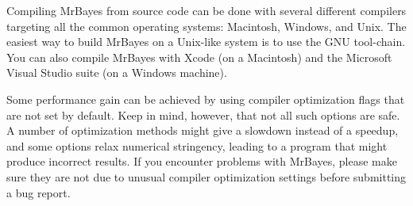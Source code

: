 \documentclass[12pt]{book}
\begin{document}
Compiling MrBayes from source code can be done with several different compilers targeting all the
common operating systems: Macintosh, Windows, and Unix. The easiest way to build MrBayes on a
Unix-like system is to use the GNU tool-chain. You can also compile MrBayes with Xcode (on a
Macintosh) and the Microsoft Visual Studio suite (on a Windows machine).

Some performance gain can be achieved by using compiler optimization flags that are not set by
default. Keep in mind, however, that not all such options are safe. A number of optimization
methods might give a slowdown instead of a speedup, and some options relax numerical stringency,
leading to a program that might produce incorrect results. If you encounter problems with MrBayes,
please make sure they are not due to unusual compiler optimization settings before submitting a bug
report.
\end{document}
